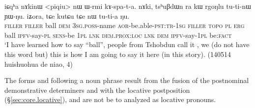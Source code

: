 \begin{exe}
\ex \label{ex:kutCu.tCe.nW.tutia}
\gll iɕqʰa nɤkinɯ <piqiu> nɯ ɯ-rmi kɤ-spa-t-a. nɤki, tsʰuβdɯn ra kɯ rgoŋlu tu-ti-nɯ ɲɯ-ŋu. iʑora, tɕe kutɕu tɕe nɯ tu-ti-a ŋu. \\
\textsc{filler} \textsc{filler} ball \textsc{dem} \textsc{3sg}.\textsc{poss}-name \textsc{aor}-be.able-\textsc{pst}:\textsc{tr}-\textsc{1sg} \textsc{filler}  \textsc{topo} \textsc{pl} \textsc{erg} ball \textsc{ipfv}-say-\textsc{pl} \textsc{sens}-be \textsc{1pl} \textsc{lnk} \textsc{dem}.\textsc{prox}:\textsc{loc} \textsc{lnk} \textsc{dem} \textsc{ipfv}-say-\textsc{1pl} be:\textsc{fact} \\
\glt `I have learned how to say ``ball'', people from Tshobdun call it , we (do not have this word but) this is how I am going to say it here (in this story). (140514 huishuohua de niao, 4)
\end{exe}

The forms  and  following a noun phrase result from the fusion of the postnominal demonstrative determiners  and  with the locative postposition  (§\ref{sec:core.locative}), and are not be to analyzed as locative pronouns.

